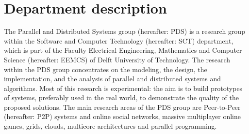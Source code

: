 \section{Department description}
The Parallel and Distributed Systems group (hereafter: PDS) is a research group within the Software and Computer Technology (hereafter: SCT) department, which is part of the Faculty Electrical Engineering, Mathematics and Computer Science (hereafter: EEMCS) of Delft University of Technology. The research within the PDS group concentrates on the modeling, the design, the implementation, and the analysis of parallel and distributed systems and algorithms. Most of this research is experimental: the aim is to build prototypes of systems, preferably used in the real world, to demonstrate the quality of the proposed solutions. The main research areas of the PDS group are Peer-to-Peer (hereafter: P2P) systems and online social networks, massive multiplayer online games, grids, clouds, multicore architectures and parallel programming. 
